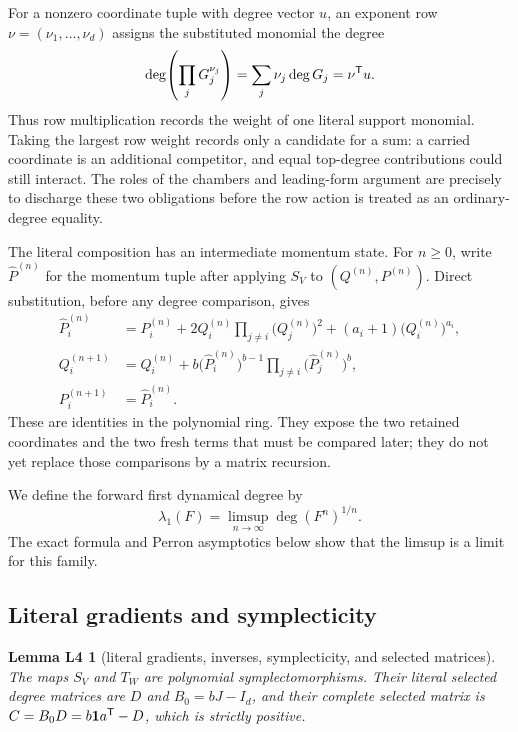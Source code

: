 \documentclass[11pt,letterpaper]{article}
\theoremstyle{plain}
\newtheorem*{lemLfour}{Lemma L4}
\begin{document}
For a nonzero coordinate tuple with degree vector \(u\), an exponent row
\(\nu=(\nu_1,\ldots,\nu_d)\) assigns the substituted monomial the degree
\[
\deg\!\left(\prod_j G_j^{\nu_j}\right)=\sum_j\nu_j\deg G_j=\nu^{\mathsf{T}}u.
\]
Thus row multiplication records the weight of one literal support monomial.  Taking the largest row weight records only a candidate for a sum: a carried coordinate is an additional competitor, and equal top-degree contributions could still interact.  The roles of the chambers and leading-form argument are precisely to discharge these two obligations before the row action is treated as an ordinary-degree equality.

The literal composition has an intermediate momentum state.  For $n\geq0$, write $\widehat P^{(n)}$ for the momentum tuple after applying $S_V$ to $(Q^{(n)},P^{(n)})$.  Direct substitution, before any degree comparison, gives
\begin{align*}
\widehat P_i^{(n)}
&=P_i^{(n)}
  +2Q_i^{(n)}\prod_{j\ne i}\bigl(Q_j^{(n)}\bigr)^2
  +(a_i+1)\bigl(Q_i^{(n)}\bigr)^{a_i},\\
Q_i^{(n+1)}
&=Q_i^{(n)}
  +b\bigl(\widehat P_i^{(n)}\bigr)^{b-1}
     \prod_{j\ne i}\bigl(\widehat P_j^{(n)}\bigr)^b,\\
P_i^{(n+1)}&=\widehat P_i^{(n)}.
\end{align*}
These are identities in the polynomial ring.  They expose the two retained coordinates and the two fresh terms that must be compared later; they do not yet replace those comparisons by a matrix recursion.

We define the forward first dynamical degree by
\[
\lambda_1(F)=\limsup_{n\to\infty}\deg(F^n)^{1/n}.
\]
The exact formula and Perron asymptotics below show that the limsup is a limit for this family.

\subsection{Literal gradients and symplecticity}

\begin{lemLfour}[literal gradients, inverses, symplecticity, and selected matrices]
The maps $S_V$ and $T_W$ are polynomial symplectomorphisms.  Their literal selected degree matrices are $D$ and $B_0=bJ-I_d$, and their complete selected matrix is $C=B_0D=b\mathbf{1} a^{\mathsf{T}}-D$, which is strictly positive.
\end{lemLfour}
\end{document}
